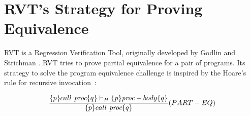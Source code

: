 \label{sec:rvtreview}
\section{RVT's Strategy for Proving Equivalence}
RVT is a Regression Verification Tool, originally developed by Godlin and Strichman \cite{DBLP:conf/dac/GodlinS09}. RVT tries to prove partial equivalence for a pair of programs. Its strategy to solve the program equivalence challenge is inspired by the Hoare's rule for recursive invocation~\cite{DBLP:series/lnm/Hoare71}: 

\begin{equation} \label{eqn:parteq}
 {\frac {\{p\} call\ \emph{proc} \{q\} \vdash_H \{p\} \emph{proc}-body \{q\}}{\{p\} call\ \emph{proc} \{q\}}} 
  (PART-EQ) 
\end{equation}

